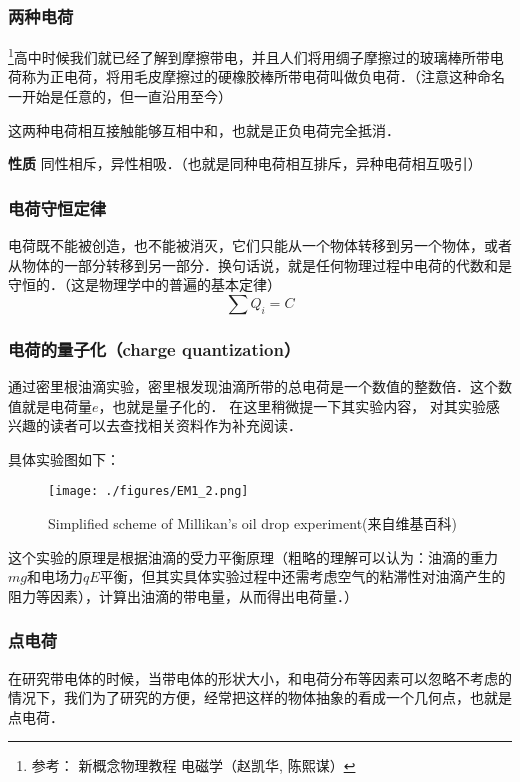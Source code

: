 
\subsubsection{两种电荷}
\footnote{参考： 新概念物理教程 电磁学（赵凯华, 陈熙谋）}高中时候我们就已经了解到摩擦带电，并且人们将用绸子摩擦过的玻璃棒所带电荷称为正电荷，将用毛皮摩擦过的硬橡胶棒所带电荷叫做负电荷．（注意这种命名一开始是任意的，但一直沿用至今）

这两种电荷相互接触能够互相中和，也就是正负电荷完全抵消．

\textbf{性质} 同性相斥，异性相吸．（也就是同种电荷相互排斥，异种电荷相互吸引）

\subsubsection{电荷守恒定律}
电荷既不能被创造，也不能被消灭，它们只能从一个物体转移到另一个物体，或者从物体的一部分转移到另一部分．换句话说，就是任何物理过程中电荷的代数和是守恒的．（这是物理学中的普遍的基本定律）
\begin{equation}
\sum Q_i=C
\end{equation}

\subsubsection{电荷的量子化（charge quantization）}
 通过密里根油滴实验，密里根发现油滴所带的总电荷是一个数值的整数倍．这个数值就是电荷量$e$，也就是量子化的．
 在这里稍微提一下其实验内容， 对其实验感兴趣的读者可以去查找相关资料作为补充阅读．

具体实验图如下：

\begin{figure}[ht]
\centering
\texttt{[image: ./figures/EM1\_2.png]}
\caption{Simplified scheme of Millikan's oil drop experiment(来自维基百科)} \label{EM1_fig1}
\end{figure}

这个实验的原理是根据油滴的受力平衡原理（粗略的理解可以认为：油滴的重力$mg$和电场力$qE$平衡，但其实具体实验过程中还需考虑空气的粘滞性对油滴产生的阻力等因素），计算出油滴的带电量，从而得出电荷量．）

\subsubsection{点电荷}

在研究带电体的时候，当带电体的形状大小，和电荷分布等因素可以忽略不考虑的情况下，我们为了研究的方便，经常把这样的物体抽象的看成一个几何点，也就是点电荷．

